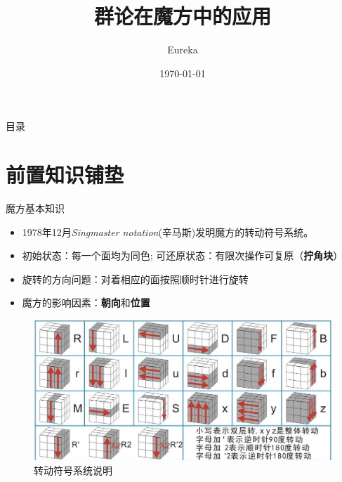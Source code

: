 \documentclass{beamer}
\title{群论在魔方中的应用}
\author{Eureka}
\date{\today}
\begin{document}
\begin{frame}[plain]
    \titlepage
\end{frame}

\begin{frame}{目录}
    \tableofcontents
\end{frame}




\section{前置知识铺垫}
\begin{frame}{魔方基本知识}
\begin{itemize}
    \item 1978年12月{\itshape Singmaster notation}(辛马斯)发明魔方的转动符号系统。
    \item 初始状态：每一个面均为同色; 可还原状态：有限次操作可复原（{\bf 拧角块}）
    \item 旋转的方向问题：对着相应的面按照顺时针进行旋转
    \item 魔方的影响因素：{\bf 朝向}和{\bf 位置}
\end{itemize}
\end{frame} 

\begin{frame}
\begin{figure}[!htb]
    \centering
    \includegraphics[scale=.27]{./rotate.jpg}
    \caption{转动符号系统说明}
    \label{转动符号系统说明}
\end{figure}
\end{frame} 
\end{document}
